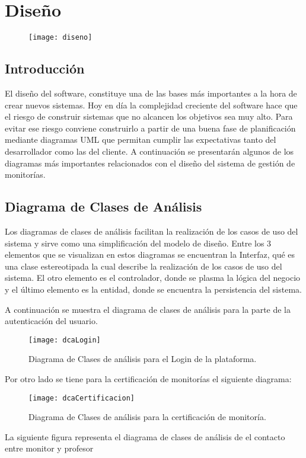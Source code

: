 \chapter{Diseño}
\begin{figure}[H]
	\centering
	\texttt{[image: diseno]}
    \centering
\end{figure}
\section{Introducción}

El diseño del software, constituye una de las bases más importantes a la hora de crear nuevos sistemas. Hoy en día la complejidad creciente del software hace que el riesgo de construir sistemas que no alcancen los objetivos sea muy alto. Para evitar ese riesgo conviene construirlo a partir de una buena fase de planificación mediante diagramas UML que permitan cumplir las expectativas tanto del desarrollador como las del cliente. A continuación se presentarán algunos de los diagramas más importantes relacionados con el diseño del sistema de gestión de monitorías.

\newpage

\section{Diagrama de Clases de Análisis}

Los diagramas de clases de análisis facilitan la realización de los casos de uso del sistema y sirve como una simplificación del modelo de diseño. Entre los 3 elementos que se visualizan en estos diagramas se encuentran la Interfaz, qué es una clase estereotipada la cual describe la realización de los casos de uso del sistema. El otro elemento es el controlador, donde se plasma la lógica del negocio y el último elemento es la entidad, donde se encuentra la persistencia del sistema. 

A continuación se muestra el diagrama de clases de análisis para la parte de la autenticación del usuario.
\begin{figure}[H]
	\centering
	\texttt{[image: dcaLogin]}
	\centering
	\caption{Diagrama de Clases de análisis para el Login de la plataforma.}
	\label{fig:dClaALogin}
\end{figure}

Por otro lado se tiene para la certificación de monitorías el siguiente diagrama:

\begin{figure}[H]
	\centering
	\texttt{[image: dcaCertificacion]}
	\centering
	\caption{Diagrama de Clases de análisis para la certificación de monitoría.}
	\label{fig:dcaCertificacion}
\end{figure}
\clearpage
La siguiente figura representa el diagrama de clases de análisis de el contacto entre monitor y profesor


